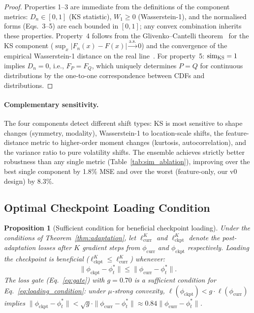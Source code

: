 \documentclass[11pt,a4paper]{article}
\newtheorem{proposition}{Proposition}
\begin{document}
\begin{proof}
Properties 1--3 are immediate from the definitions of the component metrics: $D_n \in [0,1]$ (KS statistic), $W_1 \geq 0$ (Wasserstein-1), and the normalised forms (Eqs.~3--5) are each bounded in $[0,1]$; any convex combination inherits these properties. Property~4 follows from the Glivenko--Cantelli theorem~\citep{vaart1998asymptotic} for the KS component ($\sup_x |F_n(x) - F(x)| \xrightarrow{\text{a.s.}} 0$) and the convergence of the empirical Wasserstein-1 distance on the real line~\citep{bobkov2019onedimensional}. For property~5: $\textup{sim}_{\text{KS}} = 1$ implies $D_n = 0$, i.e., $F_P = F_Q$, which uniquely determines $P = Q$ for continuous distributions by the one-to-one correspondence between CDFs and distributions.
\end{proof}

\paragraph{Complementary sensitivity.} The four components detect different shift types: KS is most sensitive to shape changes (symmetry, modality), Wasserstein-1 to location-scale shifts, the feature-distance metric to higher-order moment changes (kurtosis, autocorrelation), and the variance ratio to pure volatility shifts. The ensemble achieves strictly better robustness than any single metric (Table~\ref{tab:sim_ablation}), improving over the best single component by 1.8\% MSE and over the worst (feature-only, our v0 design) by 8.3\%.

\subsection{Optimal Checkpoint Loading Condition}
\label{sec:theory_loading}

\begin{proposition}[Sufficient condition for beneficial checkpoint loading]
\label{prop:loading}
Under the conditions of Theorem~\ref{thm:adaptation}, let $\ell^K_{\text{curr}}$ and $\ell^K_{\text{ckpt}}$ denote the post-adaptation losses after $K$ gradient steps from $\phi_{\text{curr}}$ and $\phi_{\text{ckpt}}$ respectively. Loading the checkpoint is beneficial ($\ell^K_{\text{ckpt}} \leq \ell^K_{\text{curr}}$) whenever:
\begin{equation}
    \|\phi_{\text{ckpt}} - \phi^*_t\| \leq \|\phi_{\text{curr}} - \phi^*_t\|.
    \label{eq:loading_condition}
\end{equation}
The loss gate (Eq.~\ref{eq:gate}) with $g = 0.70$ is a sufficient condition for Eq.~\ref{eq:loading_condition}: under $\mu$-strong convexity, $\ell(\phi_{\text{ckpt}}) < g \cdot \ell(\phi_{\text{curr}})$ implies $\|\phi_{\text{ckpt}} - \phi^*_t\| < \sqrt{g} \cdot \|\phi_{\text{curr}} - \phi^*_t\| \approx 0.84 \|\phi_{\text{curr}} - \phi^*_t\|$.
\end{proposition}
\end{document}
